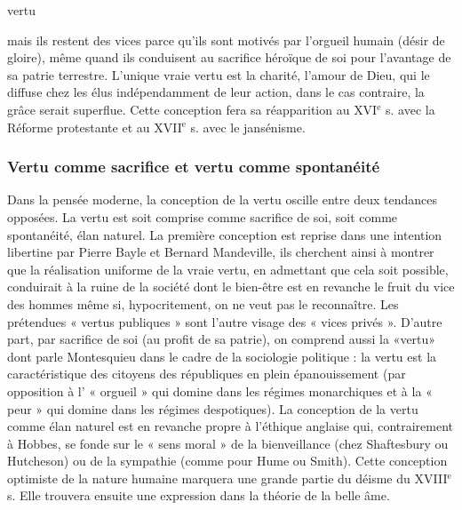 vertu

mais ils restent des vices parce qu'ils sont
motivés par l’orgueil humain (désir de
gloire), même quand ils conduisent au
sacrifice héroïque de soi pour l'avantage
de sa patrie terrestre. L’unique vraie
vertu est la charité, l'amour de Dieu, qui
le diffuse chez les élus indépendamment
de leur action, dans le cas contraire, la
grâce serait superflue. Cette conception
fera sa réapparition au {\footnotesize XVI}$^\text{e}$ s. avec la
Réforme protestante et au {\footnotesize XVII}$^\text{e}$ s. avec le
jansénisme.

\subsubsection{Vertu comme sacrifice
et vertu comme spontanéité}


Dans la pensée moderne, la conception
de la vertu oscille entre deux tendances
opposées. La vertu est soit comprise
comme sacrifice de soi, soit comme spontanéité,
élan naturel. La première conception
est reprise dans une intention
libertine par Pierre Bayle et Bernard
Mandeville, ils cherchent ainsi à montrer
que la réalisation uniforme de la vraie
vertu, en admettant que cela soit possible,
conduirait à la ruine de la société dont le
bien-être est en revanche le fruit du vice
des hommes même si, hypocritement, on
ne veut pas le reconnaître. Les prétendues
« vertus publiques » sont l’autre visage
des « vices privés ». D'autre part, par
sacrifice de soi (au profit de sa patrie), on
comprend aussi la «vertu» dont parle
Montesquieu dans le cadre de la sociologie
politique : la vertu est la caractéristique
des citoyens des républiques en
plein épanouissement (par opposition à
l' « orgueil » qui domine dans les régimes
monarchiques et à la « peur » qui domine
dans les régimes despotiques). La conception
de la vertu comme élan naturel est en
revanche propre à l’éthique anglaise qui,
contrairement à Hobbes, se fonde sur le
« sens moral » de la bienveillance (chez
Shaftesbury ou Hutcheson) ou de la sympathie
(comme pour Hume ou Smith).
Cette conception optimiste de la nature
humaine marquera une grande partie du
déisme du {\footnotesize XVIII}$^\text{e}$ s. Elle trouvera ensuite
une expression dans la théorie de la belle
âme.

